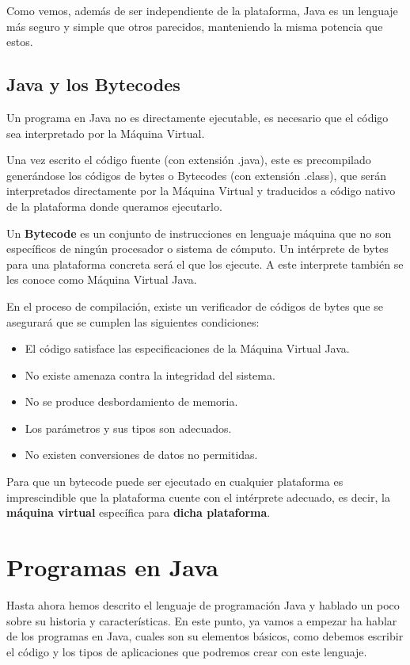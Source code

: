Como vemos, además de ser independiente de la plataforma, Java es un lenguaje más seguro y simple que otros parecidos, manteniendo la misma potencia que estos.

\subsection{Java y los Bytecodes}
Un programa en Java no es directamente ejecutable, es necesario que el código sea interpretado por la Máquina Virtual.

Una vez escrito el código fuente (con extensión .java), este es precompilado generándose los códigos de bytes o Bytecodes (con extensión .class), que serán interpretados directamente por la Máquina Virtual y traducidos a código nativo de la plataforma donde queramos ejecutarlo.

Un \textbf{Bytecode} es un conjunto de instrucciones en lenguaje máquina que no son específicos de ningún procesador o sistema de cómputo. Un intérprete de bytes para una plataforma concreta será el que los ejecute. A este interprete también se les conoce como Máquina Virtual Java.

En el proceso de compilación, existe un verificador de códigos de bytes que se asegurará que se cumplen las siguientes condiciones:

\begin{itemize}
    \item El código satisface las especificaciones de la Máquina Virtual Java.
    \item No existe amenaza contra la integridad del sistema.
    \item No se produce desbordamiento de memoria.
    \item Los parámetros y sus tipos son adecuados.
    \item No existen conversiones de datos no permitidas.
\end{itemize}

Para que un bytecode puede ser ejecutado en cualquier plataforma es imprescindible que la plataforma cuente con el intérprete adecuado, es decir, la \textbf{máquina virtual} específica para \textbf{dicha plataforma}.

\section{Programas en Java}
Hasta ahora hemos descrito el lenguaje de programación Java y hablado un poco sobre su historia y características. En este punto, ya vamos a empezar ha hablar de los programas en Java, cuales son su elementos básicos, como debemos escribir el código y los tipos de aplicaciones que podremos crear con este lenguaje.

